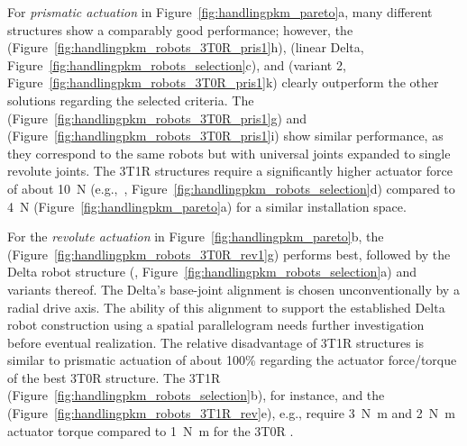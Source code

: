 For \emph{prismatic actuation} in Figure~\ref{fig:handlingpkm_pareto}a, many different structures show a comparably good performance; however, the
 (Figure~\ref{fig:handlingpkm_robots_3T0R_pris1}h),   (linear Delta, Figure~\ref{fig:handlingpkm_robots_selection}c), and  (variant 2, Figure~\ref{fig:handlingpkm_robots_3T0R_pris1}k) clearly outperform the other solutions regarding the selected criteria.
The  (Figure~\ref{fig:handlingpkm_robots_3T0R_pris1}g) and  (Figure~\ref{fig:handlingpkm_robots_3T0R_pris1}i) show similar performance, as they correspond to the same robots but with universal joints expanded to single revolute joints.
The 3T1R structures require a significantly higher actuator force of about \SI{10}{\newton} (e.g.,~, Figure~\ref{fig:handlingpkm_robots_selection}d) compared to \SI{4}{\newton} (Figure~\ref{fig:handlingpkm_pareto}a) for a similar installation space.


For the \emph{revolute actuation} in Figure~\ref{fig:handlingpkm_pareto}b, the  (Figure~\ref{fig:handlingpkm_robots_3T0R_rev1}g) performs best, followed by the Delta robot structure (, Figure~\ref{fig:handlingpkm_robots_selection}a) and variants thereof.
The Delta's base-joint alignment is chosen unconventionally by a radial drive axis.
The ability of this alignment to support the established Delta robot construction using a spatial parallelogram needs further investigation before eventual realization.
The relative disadvantage of 3T1R structures is similar to prismatic actuation of about 100\% regarding the actuator force/torque of the best 3T0R structure.
The 3T1R  (Figure~\ref{fig:handlingpkm_robots_selection}b), for instance, and the  (Figure~\ref{fig:handlingpkm_robots_3T1R_rev}e), e.g., require \SI{3}{\newton\metre} and \SI{2}{\newton\metre} actuator torque compared to \SI{1}{\newton\metre} for the 3T0R .


